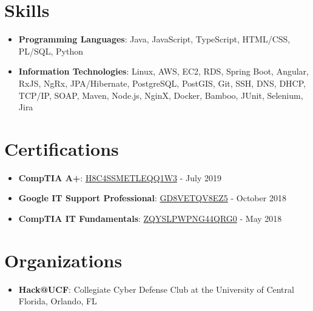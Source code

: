 \documentclass[letterpaper,11pt]{article}
\newcommand{\resumeItem}[2]{
  \item\small{
    \textbf{#1}{: #2 \vspace{-2pt}}
  }
}
\newcommand{\resumeSubItem}[2]{\resumeItem{#1}{#2}\vspace{-4pt}}
\newcommand{\resumeSubHeadingListStart}{\begin{itemize}[leftmargin=*]}
\newcommand{\resumeSubHeadingListEnd}{\end{itemize}}
\begin{document}
\section{Skills}
  \resumeSubHeadingListStart
    \resumeSubItem{Programming Languages}
      {Java, JavaScript, TypeScript, HTML/CSS, PL/SQL, Python}
    \resumeSubItem{Information Technologies}
      {Linux, AWS, EC2, RDS, Spring Boot, Angular, RxJS, NgRx, JPA/Hibernate, PostgreSQL, PostGIS, Git, SSH, DNS, DHCP, TCP/IP, SOAP, Maven, Node.js, NginX, Docker, Bamboo, JUnit, Selenium, Jira}
  \resumeSubHeadingListEnd

\section{Certifications}
  \resumeSubHeadingListStart
    \resumeSubItem{CompTIA A+}
      {\href{https://www.certmetrics.com/comptia/public/verification.aspx?code=H8C4SSMETLEQQ1W3}{H8C4SSMETLEQQ1W3}} - {{July 2019}}
    \resumeSubItem{Google IT Support Professional}
      {\href{https://www.coursera.org/account/accomplishments/professional-cert/certificate/GD8VETQV8EZ5}{GD8VETQV8EZ5}} - {{October 2018}}
    \resumeSubItem{CompTIA IT Fundamentals}
      {\href{https://www.certmetrics.com/comptia/public/verification.aspx?code=ZQYSLPWPNG44QRG0}{ZQYSLPWPNG44QRG0}} - {{May 2018}}
  \resumeSubHeadingListEnd

\section{Organizations}
  \resumeSubHeadingListStart
    \resumeSubItem{Hack@UCF}
      {Collegiate Cyber Defense Club at the University of Central Florida, Orlando, FL}
  \resumeSubHeadingListEnd

\end{document}
